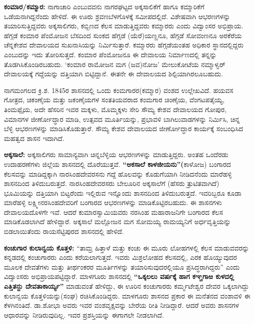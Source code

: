 \textbf{ಕಂಮಾರ/ಕಮ್ಮಾರ:} ನಾಗಾಚಾರಿ ಎಂಬುವವನು ನಾಗರಘಟ್ಟದ ಅಕ್ಕಸಾಲಿಕೆಗೆ ಹಾಗೂ ಕಮ್ಮಾರಿಕೆಗೆ ಒಡೆಯನಾಗಿದ್ದ\-ನೆಂದು ಹೇಳಿದೆ. ಈ ಊರು ಶ್ರವಣಬೆಳಗೊಳಕ್ಕೆ ಸಮೀಪದಲ್ಲಿದೆ. ವಿಶೇಷವಾಗಿ ಆಭರಣಗಳನ್ನು ತಯಾರಿಸುತ್ತಿದ್ದವರು ಅಕ್ಕಸಾಲಿಗರು, ಕಬ್ಬಿಣದ ಕೆಲಸ ಮಾಡುತ್ತಿದ್ದವರು ಕಮ್ಮಾರರು ಎಂದು ವಿದ್ವಾಂಸರ ಅಭಿಪ್ರಾಯ. ಹೆಗ್ಗಡೆ ಕಂಮಾರ ಪೆಂಮೋಜನ ಬೆಸದಿಂದ ಸುಂಕದ ಹೆಗ್ಗಡೆ (ಯೆರೆ)ಯಣ್ಣನೂ, ಹೆಗ್ಗಡೆ ಸೋವಂಣನೂ ಅರಕೆರೆಯ ಚೆನ್ನಕೇಶವ ದೇವಾಲಯದ ಸುಖನಾಸಿಯನ್ನು ನಿರ್ಮಿಸುತ್ತಾರೆ. ಕಮ್ಮಾರರು ಹೆಗ್ಗಡೆಯಂತಹ ಅಧಿಕಾರ ಸ್ಥಾನದಲ್ಲಿದ್ದರು ಎಂಬುದನ್ನು ಇದು ತೋರಿಸುತ್ತದೆ. ಕಂಮಾರ ಪೆಂಮೋಜನೂ ಈ ದೇವಾಲಯ ನಿರ್ಮಾಣದಲ್ಲಿ ತನ್ನನ್ನು ತೊಡಗಿಸಿಕೊಂಡಿರಬಹುದು. ‘ಕಂಮಾರ ರಾಮೋಜನ ಮಗ (ಜವ)ನೋಜ’ ಮೇಲುಕೋಟೆಯ ನಮ್ಮಾಳ್ವರ್​ ದೇವಾಲಯಕ್ಕೆ ಗದ್ದೆಯನ್ನು ದತ್ತಿಯಾಗಿ ಬಿಟ್ಟಿದ್ದಾನೆ. ಈತನೇ ಈ ದೇವಾಲಯದ ಶಿಲ್ಪಿಯಾಗಿರಲೂ\-ಬಹುದು.

ನಾಗಮಂಗಲದ ಕ್ರಿ.ಶ. 1845ರ ಶಾಸನದಲ್ಲಿ ಒಂದು ಕಂಮಗಾರರ(ಕಮ್ಮಾರ) ವಂಶದ ಉಲ್ಲೇಖವಿದೆ. ಹಯವಸ ಗೋತ್ರದ, ಚಿಕಂಣೈಯ ಮತ್ತು ಜಕಂಣೈಯಗಳ ಸಂತತಿಯವರಾದ ಕಂಮಗಾರ ಚಿಂಣೈಯ, ವೆಂಗಟಪತೈಯ್ಯ, ತಿಂಮಪ್ಪೈಯ, ಅದೇ ಹೆಸರಿನ ಇವರ ಮಕ್ಕಳು, ಮೊಮ್ಮಕ್ಕಳು ಸೇರಿ ಸೌಮ್ಯ ಕೇಶವ ದೇವಾಲಯದ ಗೋಪುರ, ವಿಮಾನಗಳ ಜೀರ್ಣೋದ್ಧಾರ ಮಾಡಿ, ಉತ್ಸವದ ಮೂರ್ತಿಯನ್ನು, ಪ್ರಭಾವಳಿ ಬಾಗಿಲುವಾಡಗಳನ್ನು ನಿರ್ಮಿಸಿ, ಚಿನ್ನ ಬೆಳ್ಳಿ ಆಭರಣಗಳನ್ನು ಮಾಡಿಸಿಕೊಡುತ್ತಾರೆ. ಸೌಮ್ಯ ಕೇಶವ ದೇವಾಲಯದ ಜೀರ್ಣೋದ್ಧಾರ ಕಾರ್ಯಕ್ಕೆ ಸಂಬಂಧಿಸಿದ ಮಹತ್ವದ ಶಾಸನ ಇದಾಗಿದೆ.

\textbf{ಅಕ್ಕಸಾಲೆ:} ಅಕ್ಕಸಾಲಿಗರು ಸಾಮಾನ್ಯವಾಗಿ ಚಿನ್ನಬೆಳ್ಳಿಯ ಆಭರಣಗಳನ್ನು ಮಾಡುತ್ತಿದ್ದರು. ಅಂತಹ ಒಂದೆರಡು ಉದಾಹರಣೆಗಳು ಜಿಲ್ಲೆಯ ಶಾಸನದಲ್ಲಿ ದೊರೆಯುತ್ತವೆ. \textbf{“ಅಕಸಾಲೆ ಕಾಳಜೀಯನು”(}ಕಾಳೋಜ) ಬಂಗಾರದ ಕೆಲಸವನ್ನು ಮಾಡಿದ್ದಕ್ಕಾಗಿ ನಾರಸಿಂಹದೇವರಸನು ಗದ್ದೆ ಹೊಲವನ್ನು ಕೊಡುಗೆಯಾಗಿ ನೀಡಿದನೆಂದು ಮಾರೆಹಳ್ಳಿ ಶಾಸನದಿಂದ ತಿಳಿದು\-ಬರುತ್ತದೆ. ನಾರಸಿಂಹದೇವರಸರು ಬೇಲೂರಿನ ಅಕ್ಕಸಾಲೆಗೆ (ಹೆಸರು ತ್ರುಟಿತವಾಗಿದೆ) ಭೂಮಿಯನ್ನು ದತ್ತಿಯಾಗಿ ಬಿಟ್ಟರೆಂದು ಇಲ್ಲಿರುವ ಇನ್ನೊಂದು ಶಾಸನದಿಂದ ತಿಳಿದು\-ಬರುತ್ತದೆ. ಇವರಿಬ್ಬರೂ ಕೂಡಾ ಮಾರೆಹಳ್ಳಿ ಲಕ್ಷ್ಮೀನರಸಿಂಹದೇವರಿಗೆ ಬಂಗಾರದ ಆಭರಣಗಳನ್ನು ಮಾಡಿಕೊಟ್ಟಿರಬಹುದು. ಈ ಶಾಸನಗಳು ದೇವಾಲಯದೊಳಗೇ ಇವೆ. ಆದರೆ ಕುಮಾರಸ್ವಾಮಿ\-ಯವರು ನರಸಿಂಹ ಮಹಾರಾಜನಿಗೇ ಬಂಗಾರದ ಕೆಲಸ ಮಾಡಿಕೊಡಲಾಗಿದೆ ಹೇಳಿದ್ದಾರೆ. ಅಕ್ಕಸಾಲೆ ಮಲ್ಲೋಜನ ಮಗ ಸೋಮಯ್ಯ ರಾಮಯ್ಯನಿಗೆ ಅರ್ಧವೃತ್ತಿಯನ್ನು ಬಿಡಲಾಯಿತೆಂದು ರಾಯಸೆಟ್ಟಿಪುರದ ಶಾಸನದಲ್ಲಿ ಹೇಳಿದೆ.

\textbf{ಕಂಚುಗಾರ ಕುಲಾನ್ವಯ ಕೊತ್ತಳಿ:} “ತಾಮ್ರ ಹಿತ್ತಾಳೆ ಮತ್ತು ಕಂಚು ಈ ಮೂರು ಲೋಹಗಳಲ್ಲಿ ಕೆಲಸ ಮಾಡುವವರನ್ನು ಕನ್ನಡದಲ್ಲಿ ಕಂಚುಗಾರರು ಎಂದು ಕರೆಯಲಾಗುತ್ತದೆ. ಇವರು ಮಿಶ್ರಲೋಹದ ಕೆಲಸದಲ್ಲಿ, ಎರಕ ಹೊಯ್ಯುವುದರ ಮೂಲಕ ದೇವತೆಗಳು ಮತ್ತು ತೀರ್ಥಂಕರರ ಮೂರ್ತಿಗಳನ್ನು ತಯಾರಿಸುವುದರಲ್ಲಿಯೂ ಪ್ರಸಿದ್ಧರಾಗಿದ್ದರು” ಎಂದು ವಿದ್ವಾಂಸರು ಅಭಿಪ್ರಾಯಪಟ್ಟಿದ್ದಾರೆ. ಮಾಳಗೂರು ಶಾಸನದಲ್ಲಿ \textbf{“ಒಕ್ಕಲಲು ವರ್ಷಕ್ಕೆ ಹಾಗ ಕಞ್ಚಗಾಱ ಕುಳದಲ್ಲಿ ಎತ್ತಿತನ್ದು ದೇವತಾಕಾರ್ಯ್ಯ”} ಮಾಡುವಂತೆ ಹೇಳಿದ್ದು, ಈ ಊರಿನ ಕಂಚುಗಾರರು ಕರ್ಮ್ಮಟೇಶ್ವರ ದೇವರ ಒಕ್ಕಲಾಗಿದ್ದು ಕುಲಾನ್ವಯ ಕೊತ್ತಳಿಯನ್ನು(ಸಂಘ) ರಚಿಸಿಕೊಂಡಿದ್ದರು. ಮಾಳಗೂರು ಶಾಸನದ ಪ್ರಕಾರ ಈ ಮನೆತನದ ವಂಶಾವಳಿ ಈ ಕೆಳಗಿನಂತಿದೆ. ಡಾ.ಶೋಭಾ ಅವರು ಇವರ ವಂಶವೃಕ್ಷವನ್ನು ಬೇರೆಯ ರೀತಿ ನೀಡಿದ್ದಾರೆ. ಆದರೆ ಅವರು ಶಾಸನಗಳ ಆಧಾರವನ್ನು ನೀಡಿರುವುದಿಲ್ಲ. ಇವರ ಪ್ರಶಸ್ತಿಯನ್ನು ಈಗಾಗಲೇ ನೀಡಲಾಗಿದೆ.


